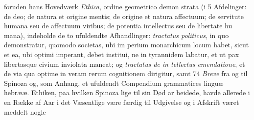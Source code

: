 \documentclass[12pt,a4paper]{book}
\begin{document}
foruden hans Hovedværk \emph{Ethica}, ordine geometrico demon\-%
strata (i 5 Afdelinger: de deo; de natura et origine mentis;
de origine et natura affectuum; de servitute humana seu de
affectuum viribus; de potentia intellectus seu de libertate hu\-%
mana), indeholde de to ufuldendte Afhandlinger: \emph{tractatus
politicus}, in quo demonstratur, quomodo societas, ubi im\-%
perium monarchicum locum habet, sicut et ea, ubi optimi
imperant, debet institui, ne in tyrannidem labatur, et ut pax
libertasque civium inviolata maneat; og \emph{tractatus de in\-%
tellectus emendatione}, et de via qua optime in veram
rerum cognitionem dirigitur, samt 74 \emph{Breve} fra og til Spinoza
og, som Anhang, et ufuldendt Compendium grammatices linguæ
hebrææ. Ethiken, paa hvilken Spinoza lige til sin Død ar\-%
beidede, havde allerede i en Række af Aar i det Væsentlige
være færdig til Udgivelse og i Afskrift været meddelt nogle
\end{document}
